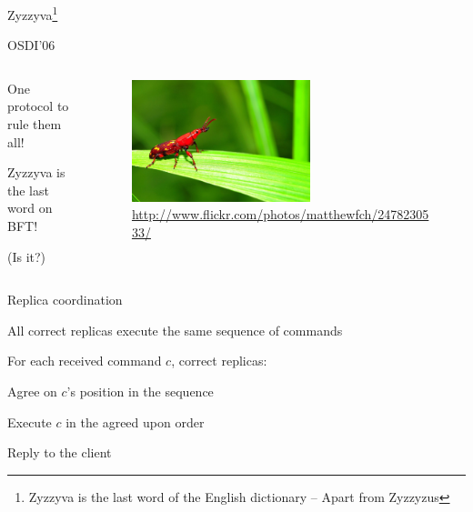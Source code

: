\begin{frame}{Zyzzyva\footnote{Zyzzyva is the last word of the English dictionary -- Apart from Zyzzyzus}}
	
\begin{block}{OSDI'06}
{\small
{}
}
\end{block}	
	
\begin{columns}
\begin{column}{0.4\textwidth}
\BIL
\item One protocol to rule them all!
\item Zyzzyva is the last word on BFT!
\item (Is it?)
\EIL
\end{column}
\begin{column}{0.6\textwidth}
\begin{figure}
	\includegraphics[width=0.6\textwidth]{zyzzyva.png}\\
	{\tiny \url{http://www.flickr.com/photos/matthewfch/2478230533/}}
\end{figure}
\end{column}
\end{columns}

\end{frame}

\begin{frame}{Replica coordination}

\BIL
\item All correct replicas execute the same sequence of commands
\item For each received command $c$, correct replicas: 
\BI
\item Agree on $c$'s position in the sequence 
\item Execute $c$ in the agreed upon order 
\item Reply to the client	
\EI
\EIL

\end{frame}

